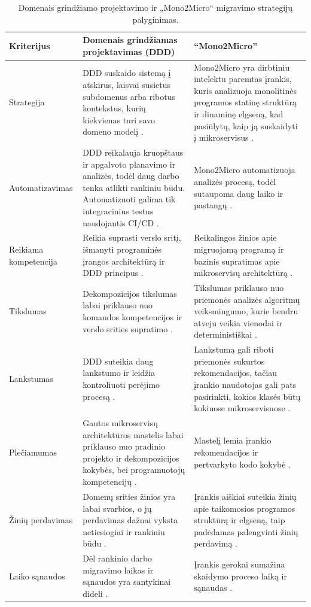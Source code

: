 \documentclass{VUMIFPSbakalaurinis}
\begin{document}
\renewcommand{\arraystretch}{1.5} %
\begin{table}
\centering
\begin{tabularx}{\textwidth}{|l|X|X|}
\hline
\textbf{Kriterijus} & \textbf{Domenais grindžiamas projektavimas (DDD)} & \textbf{\enquote{Mono2Micro}} \\ 
\hline
Strategija & DDD suskaido sistemą į atskirus, laisvai susietus subdomenus arba ribotus kontekstus, kurių kiekvienas turi savo domeno modelį \cite{New19}. &  Mono2Micro yra dirbtiniu intelektu paremtas įrankis, kuris analizuoja monolitinės programos statinę struktūrą ir dinaminę elgseną, kad pasiūlytų, kaip ją suskaidyti į mikroservisus \cite{KXK+21}. \\
\hline
Automatizavimas & DDD reikalauja kruopštaus ir apgalvoto planavimo ir analizės, todėl daug darbo tenka atlikti rankiniu būdu. Automatizuoti galima tik integracinius testus naudojantis CI/CD \cite{FBZ+19}. & Mono2Micro automatizuoja analizės procesą, todėl sutaupoma daug laiko ir pastangų \cite{KXK+21}. \\
\hline
Reikiama kompetencija & Reikia suprasti verslo sritį, išmanyti programinės įrangos architektūrą ir DDD principus \cite{New19}. &  Reikalingos žinios apie migruojamą programą ir bazinis supratimas apie mikroservisų architektūrą \cite{IBMM2M}. \\
\hline
Tikslumas & Dekompozicijos tikslumas labai priklauso nuo komandos kompetencijos ir verslo srities supratimo \cite{Wal22}. & Tikslumas priklauso nuo priemonės analizės algoritmų veiksmingumo, kurie bendru atveju veikia vienodai ir deterministiškai \cite{KXK+21, KXL+20}. \\
\hline
Lankstumas & DDD suteikia daug lankstumo ir leidžia kontroliuoti perėjimo procesą \cite{Beh18}. & Lankstumą gali riboti priemonės sukurtos rekomendacijos, tačiau įrankio naudotojas gali pats pasirinkti, kokios klasės būtų kokiuose mikroservisuose \cite{IBMM2M}. \\
\hline
Plečiamumas & Gautos mikroservisų architektūros mastelis labai priklauso nuo pradinio projekto ir dekompozicijos kokybės, bei programuotojų kompetencijų \cite{New19}. & Mastelį lemia įrankio rekomendacijos ir pertvarkyto kodo kokybė \cite{KXL+20}. \\
\hline
Žinių perdavimas & Domenų srities žinios yra labai svarbios, o jų perdavimas dažnai vyksta netiesiogiai ir rankiniu būdu \cite{FBZ+19}. & Įrankis aiškiai suteikia žinių apie taikomosios programos struktūrą ir elgseną, taip padėdamas palengvinti žinių perdavimą \cite{IBMM2M}. \\
\hline
Laiko sąnaudos & Dėl rankinio darbo migravimo laikas ir sąnaudos yra santykinai dideli \cite{New19, Beh18}. & Įrankis gerokai sumažina skaidymo proceso laiką ir sąnaudas \cite{KXK+21, KXL+20, IBMM2M}. \\
\hline
\end{tabularx}
\caption{Domenais grindžiamo projektavimo ir „Mono2Micro“ migravimo strategijų palyginimas.}
\label{tab:comparison}
\end{table}
\end{document}
